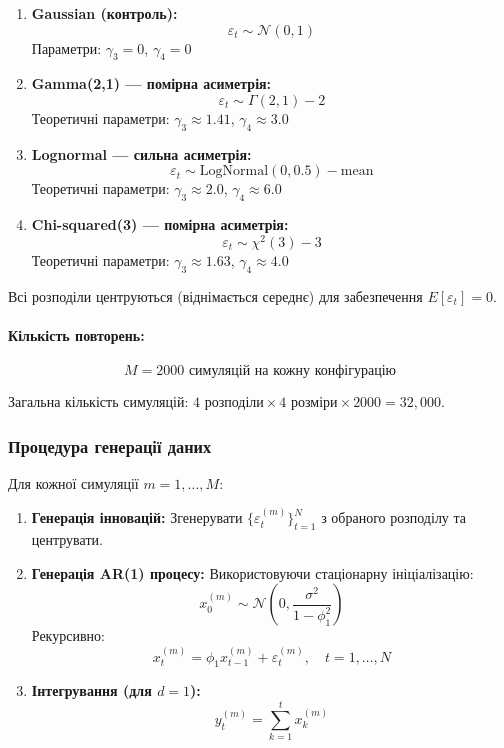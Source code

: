 \begin{enumerate}
    \item \textbf{Gaussian (контроль):}
    $$\varepsilon_t \sim \mathcal{N}(0, 1)$$
    Параметри: $\gamma_3 = 0$, $\gamma_4 = 0$

    \item \textbf{Gamma(2,1) --- помірна асиметрія:}
    $$\varepsilon_t \sim \Gamma(2, 1) - 2$$
    Теоретичні параметри: $\gamma_3 \approx 1.41$, $\gamma_4 \approx 3.0$

    \item \textbf{Lognormal --- сильна асиметрія:}
    $$\varepsilon_t \sim \text{LogNormal}(0, 0.5) - \text{mean}$$
    Теоретичні параметри: $\gamma_3 \approx 2.0$, $\gamma_4 \approx 6.0$

    \item \textbf{Chi-squared(3) --- помірна асиметрія:}
    $$\varepsilon_t \sim \chi^2(3) - 3$$
    Теоретичні параметри: $\gamma_3 \approx 1.63$, $\gamma_4 \approx 4.0$
\end{enumerate}

Всі розподіли центруються (віднімається середнє) для забезпечення $E[\varepsilon_t] = 0$.

\paragraph{Кількість повторень:}
$$M = 2000 \text{ симуляцій на кожну конфігурацію}$$

Загальна кількість симуляцій: $4 \text{ розподіли} \times 4 \text{ розміри} \times 2000 = 32{,}000$.

\subsubsection{Процедура генерації даних}
\label{subsubsec:data_generation}

Для кожної симуляції $m = 1, \ldots, M$:

\begin{enumerate}
    \item \textbf{Генерація інновацій:} Згенерувати $\{\varepsilon_t^{(m)}\}_{t=1}^{N}$ з обраного розподілу та центрувати.

    \item \textbf{Генерація AR(1) процесу:} Використовуючи стаціонарну ініціалізацію:
    $$x_0^{(m)} \sim \mathcal{N}\left(0, \frac{\sigma^2}{1-\phi_1^2}\right)$$
    Рекурсивно:
    $$x_t^{(m)} = \phi_1 x_{t-1}^{(m)} + \varepsilon_t^{(m)}, \quad t = 1, \ldots, N$$

    \item \textbf{Інтегрування (для $d=1$):}
    $$y_t^{(m)} = \sum_{k=1}^{t} x_k^{(m)}$$
\end{enumerate}

